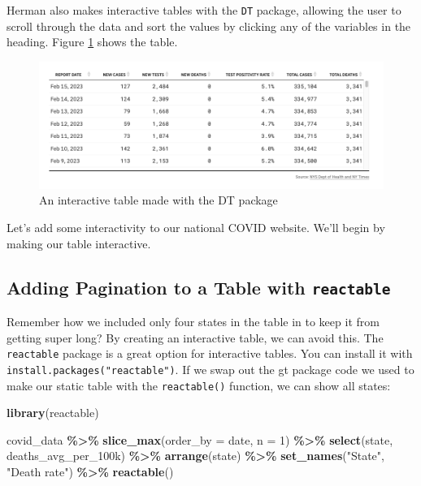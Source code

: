 \documentclass[
]{book}
\newenvironment{Shaded}{\begin{snugshade}}{\end{snugshade}}
\newcommand{\AttributeTok}[1]{\textcolor[rgb]{0.13,0.29,0.53}{#1}}
\newcommand{\DecValTok}[1]{\textcolor[rgb]{0.00,0.00,0.81}{#1}}
\newcommand{\FunctionTok}[1]{\textcolor[rgb]{0.13,0.29,0.53}{\textbf{#1}}}
\newcommand{\NormalTok}[1]{#1}
\newcommand{\SpecialCharTok}[1]{\textcolor[rgb]{0.81,0.36,0.00}{\textbf{#1}}}
\newcommand{\StringTok}[1]{\textcolor[rgb]{0.31,0.60,0.02}{#1}}
\begin{document}
Herman also makes interactive tables with the \texttt{DT} package, allowing the user to scroll through the data and sort the values by clicking any of the variables in the heading. Figure \ref{fig:dt-table} shows the table.

\begin{figure}
\includegraphics[width=1\linewidth]{assets/dt-table} \caption{An interactive table made with the DT package}\label{fig:dt-table}
\end{figure}

Let's add some interactivity to our national COVID website. We'll begin by making our table interactive.

\hypertarget{adding-pagination-to-a-table-with-reactable}{%
\subsection*{\texorpdfstring{Adding Pagination to a Table with \texttt{reactable}}{Adding Pagination to a Table with reactable}}\label{adding-pagination-to-a-table-with-reactable}}

Remember how we included only four states in the table in to keep it from getting super long? By creating an interactive table, we can avoid this. The \texttt{reactable} package is a great option for interactive tables. You can install it with \texttt{install.packages("reactable")}. If we swap out the gt package code we used to make our static table with the \texttt{reactable()} function, we can show all states:

\begin{Shaded}
\begin{Highlighting}[]
\FunctionTok{library}\NormalTok{(reactable)}

\NormalTok{covid\_data }\SpecialCharTok{\%\textgreater{}\%} 
  \FunctionTok{slice\_max}\NormalTok{(}\AttributeTok{order\_by =}\NormalTok{ date,}
            \AttributeTok{n =} \DecValTok{1}\NormalTok{) }\SpecialCharTok{\%\textgreater{}\%} 
  \FunctionTok{select}\NormalTok{(state, deaths\_avg\_per\_100k) }\SpecialCharTok{\%\textgreater{}\%} 
  \FunctionTok{arrange}\NormalTok{(state) }\SpecialCharTok{\%\textgreater{}\%} 
  \FunctionTok{set\_names}\NormalTok{(}\StringTok{"State"}\NormalTok{, }\StringTok{"Death rate"}\NormalTok{) }\SpecialCharTok{\%\textgreater{}\%} 
  \FunctionTok{reactable}\NormalTok{()}
\end{Highlighting}
\end{Shaded}
\end{document}

